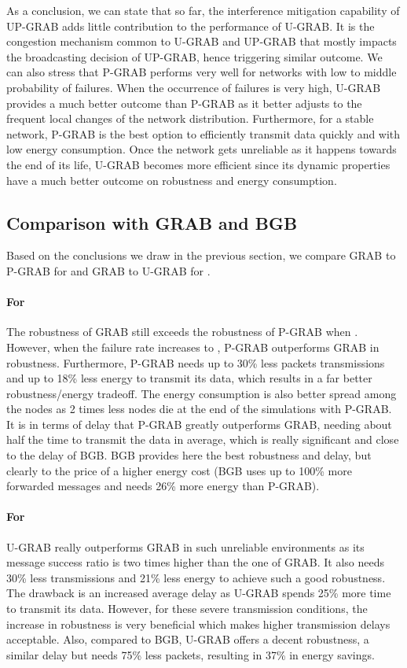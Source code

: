 \documentclass[journal, peerreview, onecolumn, draftcls]{IEEEtran}
\begin{document}
As a conclusion, we can state that so far, the interference mitigation capability of UP-GRAB adds little contribution to the performance of U-GRAB. It is the congestion mechanism common to U-GRAB and UP-GRAB that mostly impacts the broadcasting decision of UP-GRAB, hence triggering similar outcome.
We can also stress that P-GRAB performs very well for networks with low to middle probability of failures. When the occurrence of failures is very high, U-GRAB provides a much better outcome than P-GRAB as it better adjusts to the frequent local changes of the network distribution. Furthermore, for a stable network, P-GRAB is the best option to efficiently transmit data quickly and with low energy consumption. Once the network gets unreliable as it happens towards the end of its life, U-GRAB becomes more efficient since its dynamic properties have a much better outcome on robustness and energy consumption.

\subsection{Comparison with GRAB and BGB}

Based on the conclusions we draw in the previous section, we compare GRAB to P-GRAB for  and GRAB to U-GRAB for .

\paragraph{\rm For }
The robustness of GRAB still exceeds the robustness of P-GRAB when . However, when the failure rate increases to , P-GRAB outperforms GRAB in robustness. Furthermore, P-GRAB needs up to 30\% less packets transmissions and up to 18\% less energy to transmit its data, which results in a far better robustness/energy tradeoff.
The energy consumption is also better spread among the nodes as 2 times less nodes die at the end of the simulations with P-GRAB.
It is in terms of delay that P-GRAB greatly outperforms GRAB, needing about half the time to transmit the data in average, which is really significant and close to the delay of BGB. BGB provides here the best robustness and delay, but clearly to the price of a higher energy cost (BGB uses up to 100\% more forwarded messages and needs 26\% more energy than P-GRAB).

\paragraph{\rm For }
U-GRAB really outperforms GRAB in such unreliable environments as its message success ratio is two times higher than the one of GRAB. It also needs 30\% less transmissions and 21\% less energy to achieve such a good robustness. The drawback is an increased average delay as U-GRAB spends 25\% more time to transmit its data. However, for these severe transmission conditions, the increase in robustness is very beneficial which makes higher transmission delays acceptable. Also, compared to BGB, U-GRAB offers a decent robustness, a similar delay but needs 75\% less packets, resulting in 37\% in energy savings.
\end{document}
